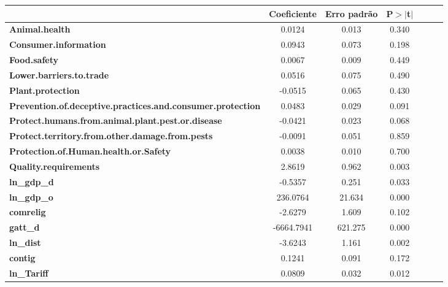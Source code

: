 \begin{center}
\begin{tabular}{lcccccc}
                                                                   & \textbf{Coeficiente} & \textbf{Erro padrão} &\textbf{P$> |$t$|$}\\
\midrule
\textbf{Animal.health}                                             &       0.0124  &        0.013     &        0.340\\
\textbf{Consumer.information}                                      &       0.0943  &        0.073     &        0.198\\
\textbf{Food.safety}                                               &       0.0067  &        0.009     &        0.449\\
\textbf{Lower.barriers.to.trade}                                   &       0.0516  &        0.075     &        0.490\\
\textbf{Plant.protection}                                          &      -0.0515  &        0.065     &        0.430\\
\textbf{Prevention.of.deceptive.practices.and.consumer.protection} &       0.0483  &        0.029     &        0.091\\
\textbf{Protect.humans.from.animal.plant.pest.or.disease}          &      -0.0421  &        0.023     &        0.068\\
\textbf{Protect.territory.from.other.damage.from.pests}            &      -0.0091  &        0.051     &        0.859\\
\textbf{Protection.of.Human.health.or.Safety}                      &       0.0038  &        0.010     &        0.700\\
\textbf{Quality.requirements}                                      &       2.8619  &        0.962     &        0.003\\
\textbf{ln\_gdp\_d}                                                &      -0.5357  &        0.251     &        0.033\\
\textbf{ln\_gdp\_o}                                                &     236.0764  &       21.634     &        0.000\\
\textbf{comrelig}                                                  &      -2.6279  &        1.609     &        0.102\\
\textbf{gatt\_d}                                                   &   -6664.7941  &      621.275     &        0.000\\
\textbf{ln\_dist}                                                  &      -3.6243  &        1.161     &        0.002\\
\textbf{contig}                                                    &       0.1241  &        0.091     &        0.172\\
\textbf{ln\_Tariff}                                                &       0.0809  &        0.032     &        0.012\\
\bottomrule
\end{tabular}
\end{center}